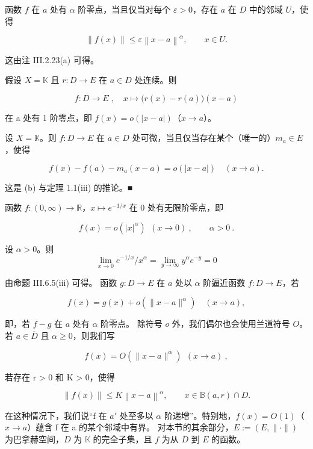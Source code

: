 \begin{remark}

\begin{items}
\item

函数 $f$ 在 $a$ 处有 $\alpha$ 阶零点，当且仅当对每个 $\varepsilon>0$，存在 $a$ 在 $D$ 中的邻域 $U$，使得

\[
\left\|f(x)\right\|\leq\varepsilon\left\|x-a\right\|^{\alpha},\qquad x\in U.
\]

\proofhead
这由注 III.2.23(a) 可得。
\item

假设 $ X = \mathbb{K} $ 且 $ r: D \to E $ 在 $ a \in D $ 处连续。则

\[
f:D\to E\;,\quad x\mapsto\big(r(x)-r(a)\big)(x-a)
\]

在 a 处有 1 阶零点，即 $ f(x) = o(|x - a|) $（$ x \to a $）。

\item

设 $ X = \mathbb{K} $。则 $ f: D \to E $ 在 $ a \in D $ 处可微，当且仅当存在某个（唯一的）$ m_a \in E $，使得

\[
f(x)-f(a)-m_{a}(x-a)=o(|x-a|)\quad(x\to a).
\]

\proofhead
这是 (b) 与定理 1.1(iii) 的推论。■
\item

函数 $ f \colon (0, \infty) \to \mathbb{R} $，$ x \mapsto e^{-1/x} $ 在 0 处有无限阶零点，即

\[
f(x)=o(|x|^{\alpha})\ \ (x\to0)\ ,\qquad\alpha>0\ .
\]

\proofhead
设 $ \alpha > 0 $。则
\[
\lim_{x\to0}e^{-1/x}/x^{\alpha}=\lim_{y\to\infty}y^{\alpha}e^{-y}=0
\]

由命题 III.6.5(iii) 可得。
函数 $g: D \to E$ 在 $a$ 处以 $\alpha$ 阶逼近函数 $f: D \to E$，若

\[
f(x)=g(x)+o(\|x-a\|^\alpha)\quad(x\to a),
\]

即，若 $f-g$ 在 $a$ 处有 $\alpha$ 阶零点。
除符号 $o$ 外，我们偶尔也会使用兰道符号 $O$。若 $a \in \overline{D}$ 且 $\alpha \geq 0$，则我们写

\[
f(x)=O(\|x-a\|^\alpha)\ \ (x\to a)\ ,
\]

若存在 r > 0 和 K > 0，使得

\[
\|f(x)\|\leq K\left\|x-a\right\|^{\alpha},\qquad x\in\mathbb{B}(a,r)\cap D.
\]

在这种情况下，我们说“f 在 $ a' $ 处至多以 $ \alpha $ 阶递增”。特别地，$ f(x) = O(1) $（$ x \to a $）蕴含 f 在 a 的某个邻域中有界。
对本节的其余部分，$ E := (E, \|\cdot\|) $ 为巴拿赫空间，$ D $ 为 $ \mathbb{K} $ 的完全子集，且 $ f $ 为从 $ D $ 到 $ E $ 的函数。

\end{items}

\end{remark}

